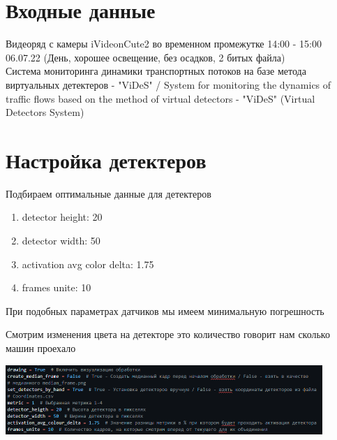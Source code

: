 \documentclass[a4paper,12pt]{article}
\begin{document}

\tableofcontents
\newpage
\section*{Входные данные}
Видеоряд с камеры iVideonCute2 во временном промежутке 14:00 - 15:00 06.07.22
(День, хорошее освещение, без осадков, 2 битых файла)\\
Система мониторинга динамики транспортных потоков на базе метода виртуальных детектеров
- "ViDeS" / System for monitoring the dynamics of traffic flows based on
the method of virtual detectors - "ViDeS" (Virtual Detectors System)


\section*{Настройка детектеров}
\begin{center}
Подбираем оптимальные данные для детектеров
\end{center}
\begin{enumerate}
    \item detector height: 20
    \item detector width: 50
    \item activation avg color delta: 1.75
    \item frames unite: 10
\end{enumerate}
\begin{center}
При подобных параметрах датчиков мы имеем минимальную погрешность
\end{center}
Смотрим изменения цвета на детекторе это количество говорит нам сколько машин проехало
\begin{center}
\includegraphics[width=0.9\textwidth]{images/detector_code.png}
\end{center}


\newpage
\end{document}
